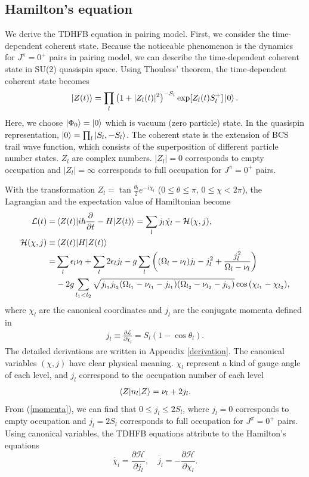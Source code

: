 \documentclass[11pt]{book} %
\begin{document}
\subsection{Hamilton's equation}
We derive the TDHFB equation in pairing model. First, we consider the time-dependent coherent state. Because the noticeable phenomenon is the dynamics for $J^{\pi}=0^+$ pairs in pairing model, we can describe the time-dependent coherent state in SU(2) quasispin space. Using Thouless' theorem, the time-dependent coherent state becomes
\begin{equation}
	\ket{Z(t)} = \prod_{l} \left(1+|Z_l(t)|^2\right)^{-S_l}
	\exp [Z_l(t) S_l^{+}] \ket{0} .
 \label{coherent}
\end{equation}
Here, we choose $\ket{\Phi_0}=\ket{0}$ which is vacuum (zero particle) state. In the quasispin representation, $\ket{0}=\prod_l \ket{S_l,-S_l}$. The coherent state is the extension of BCS trail wave function, which consists of the superposition of different particle number states. $Z_l$ are complex numbers. $|Z_l|=0$ corresponds to empty occupation and $|Z_l|=\infty$ corresponds to full occupation for $J^{\pi}=0^+$ pairs.\par
 With the transformation $Z_l = \tan{\frac{\theta_l}{2}}e^{-i\chi_l}$ ($0\leq\theta\leq\pi$, $0\leq\chi<2\pi$), the Lagrangian and the expectation value of Hamiltonian become
\begin{align}
	\mathcal{L}(t) =& \braket{Z(t)|i\hbar\frac{\partial}{\partial t}-H|Z(t)}
	=\sum_l j_l\dot{\chi_l} - \mathcal{H}(\chi,j) ,\\
	\mathcal{H}(\chi,j) \equiv& \braket{Z(t)|H|Z(t)} \nonumber \\
	=& \sum_l \epsilon_l\nu_l + \sum_l 2\epsilon_lj_l - g\sum_l \left( (\Omega_l-\nu_l) j_l - j_l^2 +\frac{j_l^2}{\Omega_l-\nu_l} \right) \nonumber \\
	&- 2g\sum_{l_1<l_2} \sqrt{j_{l_1}j_{l_2}(\Omega_{l_1}-\nu_{l_1}-j_{l_1})(\Omega_{l_2}-\nu_{l_2}-j_{l_2})}\cos{(\chi_{l_1}-\chi_{l_2})}   ,
	\label{Hamiltonian}
\end{align}
where $\chi_l$ are the canonical coordinates and $j_l$ are the conjugate momenta defined in
\begin{align}
  j_l\equiv \frac{\partial\mathcal{L}}{\partial\dot{\chi}_l}=S_l(1-\cos{\theta}_l) .
  \label{momenta}
\end{align}
The detailed derivations are written in Appendix \ref{derivation}. The canonical variables $(\chi,j)$ have clear physical meaning. $\chi_l$ represent a kind of gauge angle of each level, and $j_l$ correspond to the occupation number of each level
\begin{align}
  \braket{Z|n_l|Z} = \nu_l + 2j_l .
  \label{occ}
\end{align}
From (\ref{momenta}), we can find that $0\le j_l\le 2S_l$, where $j_l=0$ corresponds to empty occupation and $j_l=2S_l$ corresponds to full occupation for $J^{\pi}=0^+$ pairs.
Using canonical variables, the TDHFB equations attribute to the Hamilton's equations
\begin{equation}
	\dot{\chi_l} = \frac{\partial\mathcal{H}}{\partial j_l}, \quad
	\dot{j_l} = -\frac{\partial\mathcal{H}}{\partial \chi_l} .
\end{equation}
\end{document}
